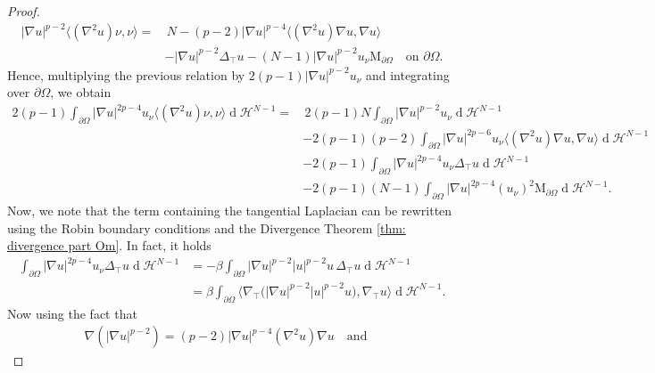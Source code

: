 \documentclass[10pt,a4paper]{amsart}
\numberwithin{equation}{section}
\renewcommand{\d}[1]{\ensuremath{\operatorname{d}\!{#1}}}
\begin{document}
\begin{proof}
\begin{equation*}
\begin{aligned}
        |\nabla u|^{p-2} \langle(\nabla^2u)\nu,\nu\rangle =& \,N - (p-2)|\nabla u|^{p-4}\langle(\nabla^2u)\nabla u,\nabla u\rangle 
        \\
        &- |\nabla u|^{p-2} \Delta_\top u - (N-1) |\nabla u|^{p-2} u_\nu \mathrm{M}_{\partial\Omega} \quad \text{on } \partial\Omega.
        \end{aligned}
    \end{equation*}
    Hence, multiplying the previous relation by $2(p-1)|\nabla u|^{p-2} u_\nu $ and integrating over $\partial\Omega$, we obtain 
    \begin{equation}\label{eq: int u nu nu}
        \begin{aligned}
        2(p-1)\int_{\partial\Omega}|\nabla u|^{2p-4} u_\nu \langle(\nabla^2u)\nu,\nu\rangle\d{}\mathcal{H}^{N-1} 
        =& \, 2(p-1)N\int_{\partial\Omega}|\nabla u|^{p-2} u_\nu\d{}\mathcal{H}^{N-1}
        \\
        &-2(p-1)(p-2)\int_{\partial\Omega}|\nabla u|^{2p-6} u_\nu \langle(\nabla^2u)\nabla u,\nabla u\rangle\d{}\mathcal{H}^{N-1}
        \\
        & -2(p-1)\int_{\partial\Omega}|\nabla u|^{2p-4} u_\nu \Delta_\top u\d{}\mathcal{H}^{N-1} 
        \\
        &-2(p-1)(N-1)\int_{\partial\Omega}|\nabla u|^{2p-4}(u_\nu)^2 \mathrm{M}_{\partial\Omega}\d{}\mathcal{H}^{N-1}.
        \end{aligned}
    \end{equation}
    Now, we note that the term containing the tangential Laplacian can be rewritten using the Robin boundary conditions and the Divergence Theorem \ref{thm: divergence part Om}. In fact, it holds
    \begin{equation*}
        \begin{split}    
        \int_{\partial\Omega}|\nabla u|^{2p-4} u_\nu \Delta_\top u\d{}\mathcal{H}^{N-1}
        &= -\beta \int_{\partial\Omega}|\nabla u|^{p-2} |u|^{p-2} u \, \Delta_\top u\d{}\mathcal{H}^{N-1}
        \\
        &= \beta \int_{\partial\Omega} \langle \nabla_\top \Big(|\nabla u|^{p-2} |u|^{p-2} u \Big), \nabla_\top u \rangle \d{}\mathcal{H}^{N-1}.
        \end{split}
    \end{equation*}
    Now using the fact that
    \begin{equation*}
    \begin{split}
        \nabla (|\nabla u|^{p-2}) = (p-2) |\nabla u|^{p-4} (\nabla^2 u) \nabla u \quad \text{and} \quad

\end{split}
\end{equation*}
\end{proof}
\end{document}
